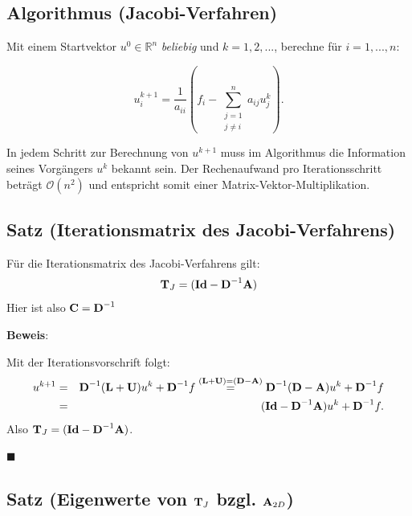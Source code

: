 \subsection{Algorithmus (Jacobi-Verfahren)}\label{ss.Allgemeines Jacobi-Verfahren}

Mit einem Startvektor $u^{0} \in \mathbb{R}^{n}$ \textit{beliebig} und $k=1,2,...$, berechne für $i=1,...,n$:

\begin{equation}
u^{k+1}_{i} = \frac {1} {a_{ii}} (f_{i} - \sum_{\substack{j = 1 \\ j \ne i}}^{n} a_{ij}u^{k}_{j}).
\end{equation}

In jedem Schritt zur Berechnung von $u^{k+1}$ muss im Algorithmus die Information seines Vorgängers $u^{k}$ bekannt sein. Der Rechenaufwand pro Iterationsschritt beträgt $\mathcal{O}(n^{2})$ und entspricht somit einer Matrix-Vektor-Multiplikation.

\subsection{Satz (Iterationsmatrix des Jacobi-Verfahrens)}\label{ss.Iterationsmatrix Jacobi}

Für die Iterationsmatrix des Jacobi-Verfahrens gilt:
\begin{equation}
{\textbf{T}}_{J} = ({\textbf{Id}} - {\textbf{D}}^{-1} {\textbf{A}})
\end{equation}
Hier ist also ${\textbf{C}} = {\textbf{D}}^{-1}$

\textbf{Beweis}:

Mit der Iterationsvorschrift folgt:
\begin{eqnarray}
u^{k+1} &=& {\textbf{D}}^{-1}({\textbf{L}}+{\textbf{U}})u^{k} + {\textbf{D}}^{-1}f \overset{({\textbf{L}}+{\textbf{U}})=({\textbf{D}}-{\textbf{A}})}{=} {\textbf{D}}^{-1}({\textbf{D}}-{\textbf{A}})u^{k}+{\textbf{D}}^{-1}f \notag \\
&=& ({\textbf{Id}}-{\textbf{D}}^{-1}{\textbf{A}})u^{k} + {\textbf{D}}^{-1}f. \notag
\end{eqnarray}
Also ${\textbf{T}}_{J} = ({\textbf{Id}} - {\textbf{D}}^{-1} {\textbf{A}})$.
\begin{flushright}
$\blacksquare$
\end{flushright}

\subsection{Satz (Eigenwerte von ${\textbf{T}}_{J}$ bzgl. ${\textbf{A}}_{2D}$)}\label{ss.EW Jacobi}

